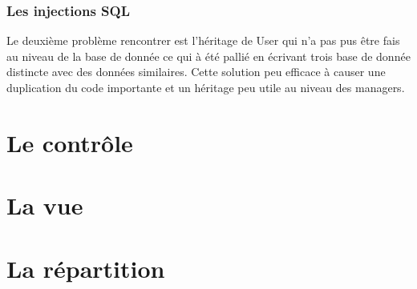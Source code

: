 \documentclass{article}
\begin{document}
		\subsubsection{Les injections SQL}
			Le deuxième problème rencontrer est l'héritage de User qui n'a pas pus être fais au niveau de la base de donnée ce qui à été pallié en écrivant trois base de donnée distincte avec des données similaires. Cette solution peu efficace à causer une duplication du code importante et un héritage peu utile au niveau des managers.
			
\section{Le contrôle}
\section{La vue}
\section{La répartition}
\end{document}
